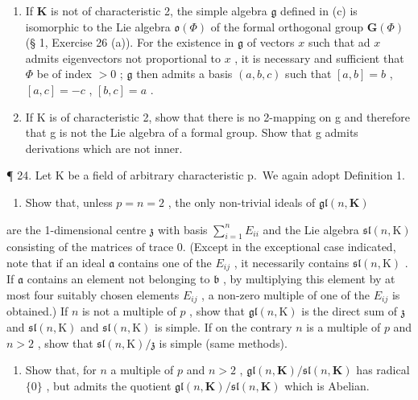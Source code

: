 \begin{enumerate}
\item
  If \(\mathbf{K}\) is not of characteristic 2, the simple algebra \(\mathfrak{g}\) defined in (c) is isomorphic to the Lie algebra \(\mathfrak{o}(\Phi)\) of the formal orthogonal group \(\mathbf{G}(\Phi)\) (§ 1, Exercise 26 (a)). For the existence in \(\mathfrak{g}\) of vectors \(x\) such that ad \(x\) admits eigenvectors not proportional to \(x\) , it is necessary and sufficient that \(\Phi\) be of index \(>0\) ; \(\mathfrak{g}\) then admits a basis \((a, b, c)\) such that \([a, b] = b\) , \([a, c] = -c\) , \([b, c] = a\) .
\item
  If K is of characteristic 2, show that there is no 2-mapping on g and therefore that g is not the Lie algebra of a formal group. Show that g admits derivations which are not inner.
\end{enumerate}

¶ 24. Let K be a field of arbitrary characteristic p.~We again adopt Definition 1.

\begin{enumerate}
\def\labelenumi{(\alph{enumi})}
\tightlist
\item
  Show that, unless \(p = n = 2\) , the only non-trivial ideals of \(\mathfrak{gl}(n, \mathbf{K})\)
\end{enumerate}

are the 1-dimensional centre \(\mathfrak{z}\) with basis \(\sum_{i=1}^{n} E_{ii}\) and the Lie algebra \(\mathfrak{sl}(n, \mathrm{K})\) consisting of the matrices of trace 0. (Except in the exceptional case indicated, note that if an ideal \(\mathfrak{a}\) contains one of the \(E_{ij}\) , it necessarily contains \(\mathfrak{sl}(n, \mathrm{K})\) . If \(\mathfrak{a}\) contains an element not belonging to \(\mathfrak{b}\) , by multiplying this element by at most four suitably chosen elements \(E_{ij}\) , a non-zero multiple of one of the \(E_{ij}\) is obtained.) If \(n\) is not a multiple of \(p\) , show that \(\mathfrak{gl}(n, \mathrm{K})\) is the direct sum of \(\mathfrak{z}\) and \(\mathfrak{sl}(n, \mathrm{K})\) and \(\mathfrak{sl}(n, \mathrm{K})\) is simple. If on the contrary \(n\) is a multiple of \(p\) and \(n > 2\) , show that \(\mathfrak{sl}(n, \mathrm{K}) / \mathfrak{z}\) is simple (same methods).

\begin{enumerate}
\def\labelenumi{(\alph{enumi})}
\setcounter{enumi}{1}
\tightlist
\item
  Show that, for \(n\) a multiple of \(p\) and \(n > 2\) , \(\mathfrak{gl}(n, \mathbf{K}) / \mathfrak{sl}(n, \mathbf{K})\) has radical \(\{0\}\) , but admits the quotient \(\mathfrak{gl}(n, \mathbf{K}) / \mathfrak{sl}(n, \mathbf{K})\) which is Abelian.
\end{enumerate}

